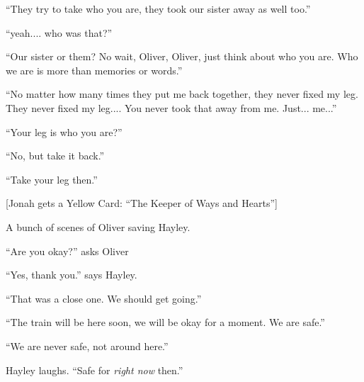 ``They try to take who you are, they took our sister away as well too.''

``yeah.... who was that?''

``Our sister or them?  No wait, Oliver, Oliver, just think about who you are.  Who we are is more than memories or words.''

``No matter how many times they put me back together, they never fixed my leg.  They never fixed my leg.... You never took that away from me.  Just... me...''

``Your leg is who you are?''

``No, but take it back.''

``Take your leg then.'' 



{[}Jonah gets a Yellow Card: ``The Keeper of Ways and Hearts''{]}






A bunch of scenes of Oliver saving Hayley.






``Are you okay?'' asks Oliver

``Yes, thank you.'' says Hayley.

``That was a close one.  We should get going.''

``The train will be here soon, we will be okay for a moment.  We are safe.''

``We are never safe, not around here.''

Hayley laughs.  ``Safe for \textit{right now} then.''

